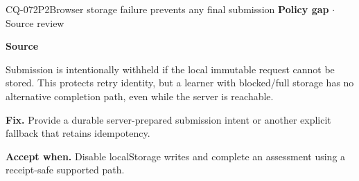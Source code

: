 \begin{finding}{CQ-072}{P2}{Browser storage failure prevents any final submission}
\textbf{Policy gap} $\cdot$ Source review\par
\textbf{Source}\quad{}\par
Submission is intentionally withheld if the local immutable request cannot be stored. This protects retry identity, but a learner with blocked/full storage has no alternative completion path, even while the server is reachable.\par
\textbf{Fix.} Provide a durable server-prepared submission intent or another explicit fallback that retains idempotency.\par
\textbf{Accept when.} Disable localStorage writes and complete an assessment using a receipt-safe supported path.
\end{finding}
\clearpage
